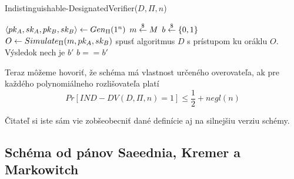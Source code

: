 \begin{procedure}[H]
    \caption{Indistinguishable-DesignatedVerifier($D,\Pi,n$)}
    \label{proc:ind-dv}
    $\langle pk_A,sk_A,pk_B,sk_B \rangle \leftarrow Gen_{\Pi}(1^n)$ \;
    $m \overset{\$}{\leftarrow} M$ \;
    $b \overset{\$}{\leftarrow} \{0,1\}$ \;
        {$O \leftarrow Simulate_\Pi(m,pk_A,sk_B)$}
    spusť algoritmus $D$ s prístupom ku oráklu $O$. Výsledok nech je
    $b'$ \;
    \Return $b==b'$\;
\end{procedure}

Teraz môžeme hovoriť, že schéma má vlastnost určeného overovateľa, ak
pre každého polynomiálneho rozlišovateľa platí
\begin{equation*}
    Pr[IND-DV(D,\Pi,n)=1] \le \frac{1}{2} + negl(n)
\end{equation*}

Čitateľ si iste sám vie zobšeobecniť dané definície aj na silnejšiu
verziu schémy.

\subsection{Schéma od pánov Saeednia, Kremer a Markowitch}
\todo{}




